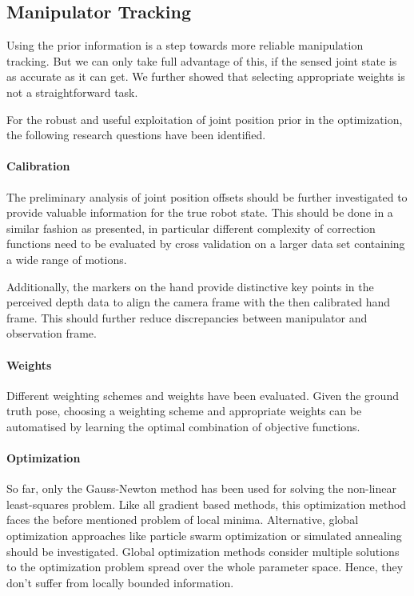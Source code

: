 \subsection{Manipulator Tracking}

Using the prior information is a step towards more reliable manipulation tracking. But we can only take full advantage of this, if the sensed joint state is as accurate as it can get. We further showed that selecting appropriate weights is not a straightforward task.

For the robust and useful exploitation of joint position prior in the optimization, the following research questions have been identified.

\paragraph{Calibration}
The preliminary analysis of joint position offsets should be further investigated to provide valuable information for the true robot state. This should be done in a similar fashion as presented, in particular different complexity of correction functions need to be evaluated by cross validation on a larger data set containing a wide range of motions.

Additionally, the markers on the hand provide distinctive key points in the perceived depth data to align the camera frame with the then calibrated hand frame. This should further reduce discrepancies between manipulator and observation frame.

\paragraph{Weights}
Different weighting schemes and weights have been evaluated. Given the ground truth pose, choosing a weighting scheme and appropriate weights can be automatised by learning the optimal combination of objective functions.

\paragraph{Optimization}
So far, only the Gauss-Newton method has been used for solving the non-linear least-squares problem. Like all gradient based methods, this optimization method faces the before mentioned problem of local minima. Alternative, global optimization approaches like particle swarm optimization or simulated annealing should be investigated. Global optimization methods consider multiple solutions to the optimization problem spread over the whole parameter space. Hence, they don't suffer from locally bounded information.



